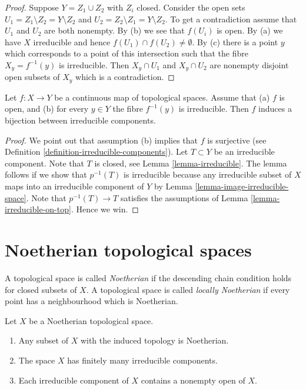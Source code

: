 \begin{proof}
Suppose $Y = Z_1 \cup Z_2$ with $Z_i$ closed.
Consider the open sets $U_1 = Z_1 \setminus Z_2 = Y \setminus Z_2$ and
$U_2 = Z_2 \setminus Z_1 = Y \setminus Z_2$. To get a contradiction
assume that $U_1$ and $U_2$ are both nonempty. By (b) we see that $f(U_i)$
is open. By (a) we have $X$ irreducible and hence
$f(U_1) \cap f(U_2) \not = \emptyset$. By (c) there is a point $y$ which
corresponds to a point of this intersection such that the fibre
$X_y = f^{-1}(y)$ is irreducible. Then $X_y \cap U_1$ and
$X_y \cap U_2$ are nonempty disjoint open subsets of $X_y$ which is
a contradiction.
\end{proof}

\begin{lemma}
\label{lemma-irreducible-fibres-irreducible-components}
Let $f : X \to Y$ be a continuous map of topological spaces.
Assume that (a) $f$ is open, and
(b) for every $y \in Y$ the fibre $f^{-1}(y)$ is irreducible.
Then $f$ induces a bijection between irreducible components.
\end{lemma}

\begin{proof}
We point out that assumption (b) implies that $f$ is surjective (see
Definition \ref{definition-irreducible-components}).
Let $T \subset Y$ be an irreducible component.
Note that $T$ is closed, see Lemma \ref{lemma-irreducible}.
The lemma follows if we show that $p^{-1}(T)$ is irreducible
because any irreducible subset of $X$ maps into an irreducible component
of $Y$ by Lemma \ref{lemma-image-irreducible-space}.
Note that $p^{-1}(T) \to T$ satisfies the assumptions
of Lemma \ref{lemma-irreducible-on-top}. Hence we win.
\end{proof}


\section{Noetherian topological spaces}
\label{section-noetherian}

\begin{definition}
\label{definition-noetherian}
A topological space is called {\it Noetherian}
if the descending chain condition holds for
closed subsets of $X$. A topological space is called
{\it locally Noetherian} if every point has a neighbourhood
which is Noetherian.
\end{definition}

\begin{lemma}
\label{lemma-Noetherian}
Let $X$ be a Noetherian topological space.
\begin{enumerate}
\item Any subset of $X$ with the induced topology is Noetherian.
\item The space $X$ has finitely many irreducible components.
\item Each irreducible component of $X$ contains a nonempty open of $X$.
\end{enumerate}
\end{lemma}


